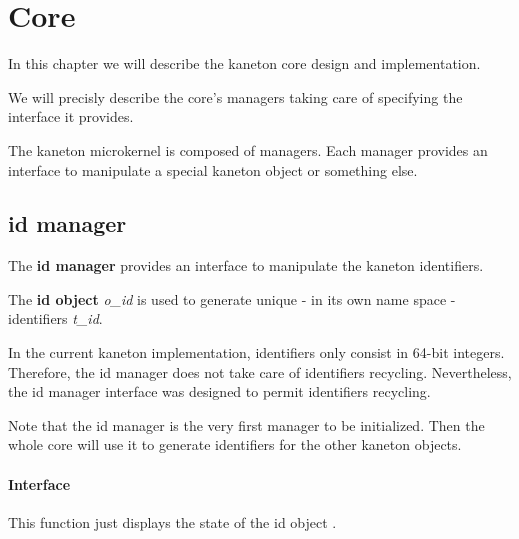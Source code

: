 
%
%

\chapter{Core}

In this chapter we will describe the kaneton core design and implementation.

We will precisly describe the core's managers taking care of specifying the
interface it provides.

\newpage

%
%

The kaneton microkernel is composed of managers. Each manager provides
an interface to manipulate a special kaneton object or something else.

%
%

\section{id manager}

The \textbf{id manager} provides an interface to manipulate the
kaneton identifiers.

The \textbf{id object} \textit{o\_id} is used to generate unique
- in its own name space - identifiers \textit{t\_id}.

In the current kaneton implementation, identifiers only consist in 64-bit
integers. Therefore, the id manager does not take care of identifiers
recycling. Nevertheless, the id manager interface was designed to permit
identifiers recycling.

Note that the id manager is the very first manager to be initialized. Then
the whole core will use it to generate identifiers for the other kaneton
objects.

%
%

\subsubsection{Interface}

	 {
	   This function just displays the state of the id object
	   .
	 }

